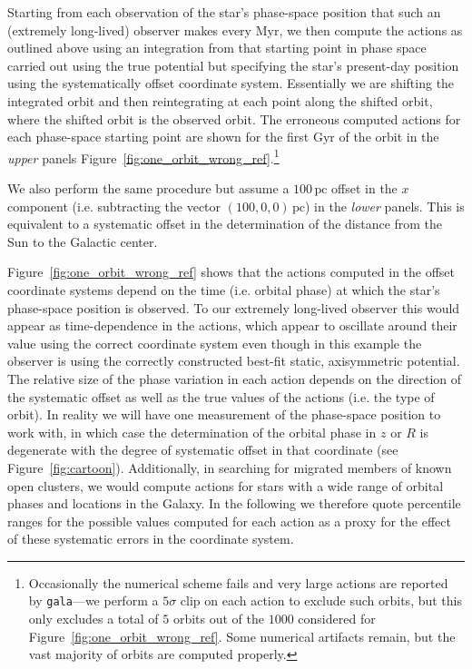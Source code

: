 \documentclass[twocolumn]{aastex62}
\newcommand{\pc}{\text{pc}}
\newcommand{\Myr}{\text{Myr}}
\newcommand{\Gyr}{\text{Gyr}}
\begin{document}
Starting from each observation of the star's phase-space position that such an
(extremely long-lived) observer makes every $\Myr$, we then compute the
actions as outlined above using an integration from that starting point in
phase space carried out using the true potential but specifying the star's
present-day position using the systematically offset coordinate system.
Essentially we are shifting the integrated orbit and then reintegrating at
each point along the shifted orbit, where the shifted orbit is the observed
orbit. The erroneous computed actions for each phase-space starting point are
shown for the first $\Gyr$ of the orbit in the {\em upper} panels
Figure~\ref{fig:one_orbit_wrong_ref}.\footnote{Occasionally the numerical
scheme fails and very large actions are reported by \texttt{gala}---we perform
a $5\sigma$ clip on each action to exclude such orbits, but this only excludes
a total of $5$ orbits out of the $1000$ considered for
Figure~\ref{fig:one_orbit_wrong_ref}. Some numerical artifacts remain, but the
vast majority of orbits are computed properly.}
    
We also perform the same procedure but assume a $100\,\pc$ offset in the $x$
    component (i.e. subtracting the vector $(100, 0, 0)\,\pc$) in the {\em
    lower} panels. This is equivalent to a systematic offset in the
    determination of the distance from the Sun to the Galactic center.

Figure~\ref{fig:one_orbit_wrong_ref} shows that the actions computed in the
offset coordinate systems depend on the time (i.e. orbital phase) at which the
star's phase-space position is observed. To our extremely long-lived observer
this would appear as time-dependence in the actions, which appear to oscillate
around their value using the correct coordinate system even though in this
example the observer is using the correctly constructed best-fit static,
axisymmetric potential. The relative size of the phase variation in each
action depends on the direction of the systematic offset as well as the true
values of the actions (i.e. the type of orbit). In reality we will have one
measurement of the phase-space position to work with, in which case the
determination of the orbital phase in $z$ or $R$ is degenerate with the degree
of systematic offset in that coordinate (see Figure~\ref{fig:cartoon}).
Additionally, in searching for migrated members of known open clusters, we
would compute actions for stars with a wide range of orbital phases and
locations in the Galaxy. In the following we therefore quote percentile ranges
for the possible values computed for each action as a proxy for the effect of
these systematic errors in the coordinate system.
\end{document}
